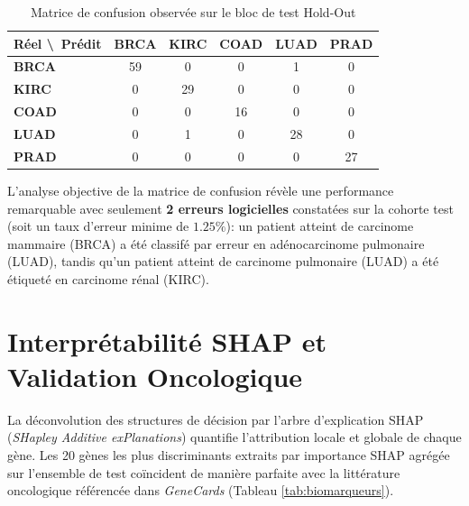 \documentclass[12pt,a4paper]{report}
\begin{document}
\begin{table}[H]
\centering
\caption{Matrice de confusion observ\'ee sur le bloc de test Hold-Out}
\label{tab:confusion_results}
\begin{tabular}{lccccc}
\toprule
\textbf{R\'eel \textbackslash \ Pr\'edit} & \textbf{BRCA} & \textbf{KIRC} & \textbf{COAD} & \textbf{LUAD} & \textbf{PRAD} \\
\midrule
\textbf{BRCA} & \cellcolor{successbg}59 & 0 & 0 & \cellcolor{warningbg}1 & 0 \\
\textbf{KIRC} & 0 & \cellcolor{successbg}29 & 0 & 0 & 0 \\
\textbf{COAD} & 0 & 0 & \cellcolor{successbg}16 & 0 & 0 \\
\textbf{LUAD} & 0 & \cellcolor{warningbg}1 & 0 & \cellcolor{successbg}28 & 0 \\
\textbf{PRAD} & 0 & 0 & 0 & 0 & \cellcolor{successbg}27 \\
\bottomrule
\end{tabular}
\end{table}

L'analyse objective de la matrice de confusion r\'ev\`ele une performance remarquable avec seulement \textbf{2 erreurs logicielles} constat\'ees sur la cohorte test (soit un taux d'erreur minime de $1.25\%$): un patient atteint de carcinome mammaire (BRCA) a \'et\'e classif\'e par erreur en ad\'enocarcinome pulmonaire (LUAD), tandis qu'un patient atteint de carcinome pulmonaire (LUAD) a \'et\'e étiqueté en carcinome r\'enal (KIRC).

\section{Interpr\'etabilit\'e SHAP et Validation Oncologique}
La d\'econvolution des structures de d\'ecision par l'arbre d'explication SHAP (\textit{SHapley Additive exPlanations}) quantifie l'attribution locale et globale de chaque g\`ene. Les 20 g\`enes les plus discriminants extraits par importance SHAP agr\'eg\'ee sur l'ensemble de test co\"incident de mani\`ere parfaite avec la litt\'erature oncologique r\'ef\'erenc\'ee dans \textit{GeneCards} (Tableau \ref{tab:biomarqueurs}).
\end{document}
